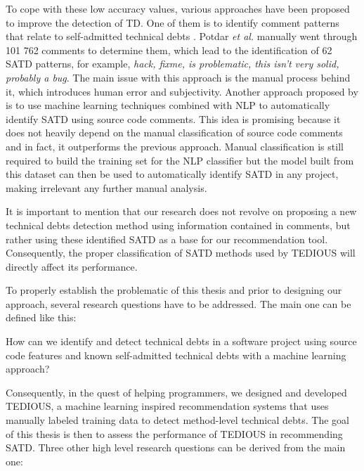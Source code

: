 To cope with these low accuracy values, various approaches have been proposed to improve the detection of \ac{TD}. One of them is to identify comment patterns that relate to self-admitted technical debts \citep{PotdarS14}. Potdar \emph{et al.} manually went through 101 762 comments to determine them, which lead to the identification of 62 \ac{SATD} patterns, for example, \emph{hack, fixme, is problematic, this isn't very solid, probably a bug}. The main issue with this approach is the manual process behind it, which introduces human error and subjectivity. Another approach proposed by \citet{MaldonadoNLP} is to use machine learning techniques combined with \ac{NLP} to automatically identify \ac{SATD} using source code comments. This idea is promising because it does not heavily depend on the manual classification of source code comments and in fact, it outperforms the previous approach. Manual classification is still required to build the training set for the NLP classifier but the model built from this dataset can then be used to automatically identify \ac{SATD} in any project, making irrelevant any further manual analysis. \par

It is important to mention that our research does not revolve on proposing a new technical debts detection method using information contained in comments, but rather using these identified SATD as a base for our recommendation tool. Consequently, the proper classification of \ac{SATD} methods used by \ac{TEDIOUS} will directly affect its performance. 

To properly establish the problematic of this thesis and prior to designing our approach, several research questions have to be addressed. The main one can be defined like this:  \par

\begin{center}
\begin{framed}
	\noindent How can we identify and detect technical debts in a software project using source code features and known self-admitted technical debts with a machine learning approach?
\end{framed}
\end{center}

Consequently, in the quest of helping programmers, we designed and developed TEDIOUS, a machine learning inspired recommendation systems that uses manually labeled training data to detect method-level technical debts. The goal of this thesis is then to assess the performance of TEDIOUS in recommending SATD. Three other high level research questions can be derived from the main one:

